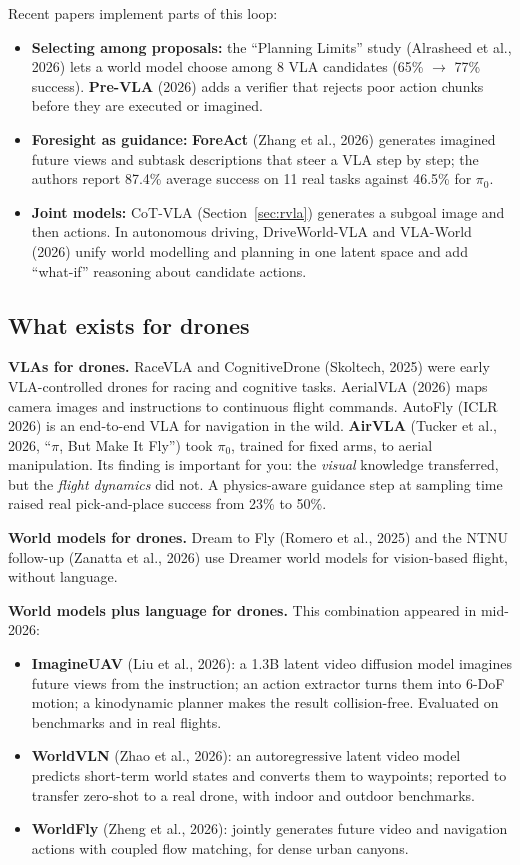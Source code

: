 Recent papers implement parts of this loop:
\begin{itemize}
\item \textbf{Selecting among proposals:} the ``Planning Limits'' study (Alrasheed et al., 2026) lets a world model choose among 8 VLA candidates (65\% $\to$ 77\% success). \textbf{Pre-VLA} (2026) adds a verifier that rejects poor action chunks before they are executed or imagined.
\item \textbf{Foresight as guidance:} \textbf{ForeAct} (Zhang et al., 2026) generates imagined future views and subtask descriptions that steer a VLA step by step; the authors report 87.4\% average success on 11 real tasks against 46.5\% for $\pi_0$.
\item \textbf{Joint models:} CoT-VLA (Section~\ref{sec:rvla}) generates a subgoal image and then actions. In autonomous driving, DriveWorld-VLA and VLA-World (2026) unify world modelling and planning in one latent space and add ``what-if'' reasoning about candidate actions.
\end{itemize}

\subsection{What exists for drones}
\label{sec:drones}
\textbf{VLAs for drones.} RaceVLA and CognitiveDrone (Skoltech, 2025) were early VLA-controlled drones for racing and cognitive tasks. AerialVLA (2026) maps camera images and instructions to continuous flight commands. AutoFly (ICLR 2026) is an end-to-end VLA for navigation in the wild. \textbf{AirVLA} (Tucker et al., 2026, ``$\pi$, But Make It Fly'') took $\pi_0$, trained for fixed arms, to aerial manipulation. Its finding is important for you: the \emph{visual} knowledge transferred, but the \emph{flight dynamics} did not. A physics-aware guidance step at sampling time raised real pick-and-place success from 23\% to 50\%.

\textbf{World models for drones.} Dream to Fly (Romero et al., 2025) and the NTNU follow-up (Zanatta et al., 2026) use Dreamer world models for vision-based flight, without language.

\textbf{World models plus language for drones.} This combination appeared in mid-2026:
\begin{itemize}
\item \textbf{ImagineUAV} (Liu et al., 2026): a 1.3B latent video diffusion model imagines future views from the instruction; an action extractor turns them into 6-DoF motion; a kinodynamic planner makes the result collision-free. Evaluated on benchmarks and in real flights.
\item \textbf{WorldVLN} (Zhao et al., 2026): an autoregressive latent video model predicts short-term world states and converts them to waypoints; reported to transfer zero-shot to a real drone, with indoor and outdoor benchmarks.
\item \textbf{WorldFly} (Zheng et al., 2026): jointly generates future video and navigation actions with coupled flow matching, for dense urban canyons.
\end{itemize}

